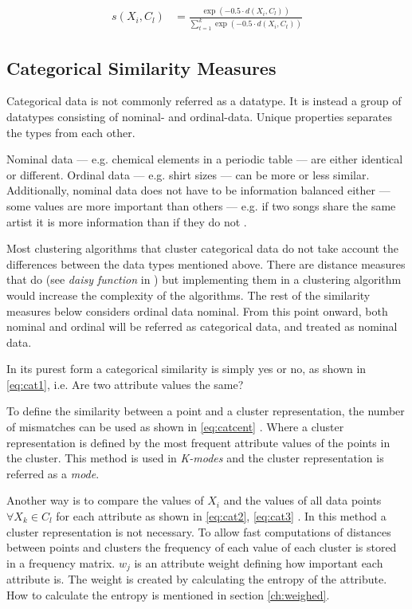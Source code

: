 \documentclass[../report.tex]{subfiles}
\begin{document}
\begin{align}
  \label{eq:simnum}
    s(X_i,C_l) &= \frac{\exp(-0.5 \cdot d(X_i,C_l))}{\sum^k_{t=1}\exp(-0.5 \cdot d(X_i,C_t))}
\end{align}


\subsection{Categorical Similarity Measures}
Categorical data is not commonly referred as a datatype. It is instead a group of datatypes consisting of nominal- and ordinal-data. Unique properties separates the types from each other.

Nominal data --- e.g. chemical elements in a periodic table  --- are either identical or different. Ordinal data --- e.g. shirt sizes --- can be more or less similar. Additionally, nominal data does not have to be information balanced either --- some values are more important than others --- e.g. if two songs share the same artist it is more information than if they do not \cite{Kaufman1990}.

Most clustering algorithms that cluster categorical data do not take account the differences between the data types mentioned above. There are distance measures that do (see \textit{daisy function} in \cite{Kaufman1990}) but implementing them in a clustering algorithm would increase the complexity of the algorithms. The rest of the similarity measures below considers ordinal data nominal. From this point onward, both nominal and ordinal will be referred as categorical data, and treated as nominal data.

In its purest form a categorical similarity is simply yes or no, as shown in \ref{eq:cat1}, i.e. Are two attribute values the same? \cite{Guha2000, Kaufman1990}

To define the similarity between a point and a cluster representation, the number of mismatches can be used as shown in \ref{eq:catcent} \cite{Ng1999,Huang97clusteringlarge}. Where a cluster representation is defined by the most frequent attribute values of the points in the cluster. This method is used in \textit{K-modes} and the cluster representation is referred as a \textit{mode}.

Another way is to compare the values of $X_i$ and the values of all data points $\forall X_k \in C_l$ for each attribute as shown in \ref{eq:cat2}, \ref{eq:cat3} \cite{Guha2000, Cheung2013}. In this method a cluster representation is not necessary. To allow fast computations of distances between points and clusters the frequency of each value of each cluster is stored in a frequency matrix. $w_j$ is an attribute weight defining how important each attribute is. The weight is created by calculating the entropy of the attribute. How to calculate the entropy is mentioned in section \ref{ch:weighed}.
\end{document}
